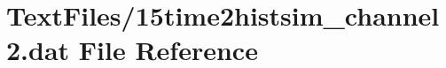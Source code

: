 \hypertarget{15time2histsim__channel2_8dat}{}\section{Text\+Files/15time2histsim\+\_\+channel2.dat File Reference}
\label{15time2histsim__channel2_8dat}
